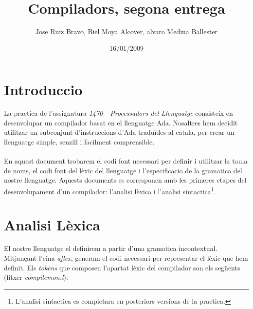 \documentclass[10pt]{report}
\title{Compiladors, segona entrega}
\author{Jose Ruiz Bravo, Biel Moya Alcover, alvaro Medina Ballester}
\date{16/01/2009}
\begin{document}
    \maketitle
    \chapter{Introduccio}
        La practica de l'assignatura \textit{1470 - Processadors del Llenguatge} consisteix en
        desenvolupar un compilador basat en el llenguatge Ada. Nosaltres hem decidit 
        utilitzar un subconjunt d'instruccions d'Ada traduïdes al catala, per crear
        un llenguatge simple, senzill i facilment comprensible.
        \\
        \\
        En aquest document trobarem el codi font necessari per definir i utilitzar la
        taula de noms, el codi font del lèxic del llenguatge i l'especificacio de la
        gramatica del nostre llenguatge. Aquests documents es corresponen amb les primeres
        etapes del desenvolupament d'un compilador: l'analisi lèxica i l'analisi sintactica\footnote{L'analisi sintactica es completara en posteriors versions de la practica.}.
    \newpage
    \chapter{Analisi Lèxica}
        El nostre llenguatge el definirem a partir d'una gramatica incontextual. Mitjançant l'eina \textit{aflex}, generam el codi necessari per representar el lèxic que hem definit. Els \textit{tokens} que composen l'apartat lèxic del compilador son els següents (fitxer \textit{compilemon.l}):
        \\
    
\end{document}
